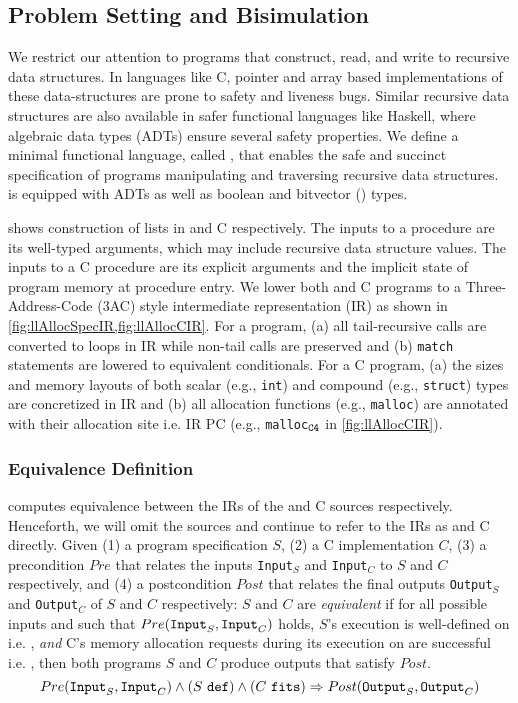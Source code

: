 \subsection{Problem Setting and Bisimulation}
\label{sec:syn-setting-bisimulation}
We restrict our attention to programs that construct, read, and write
to recursive data structures. In languages like C, pointer and array based
implementations of these data-structures are prone to safety and liveness bugs.
Similar recursive data structures are also available in safer functional languages like Haskell,
where algebraic data types (ADTs) \cite{hope} ensure several safety properties.
We define a minimal functional language, called \SpecL{}, that enables the safe
and succinct specification of programs manipulating and traversing recursive data structures.
\SpecL{} is equipped with ADTs as well as boolean and bitvector () types.



 shows construction of lists in \SpecL{} and C respectively.
The inputs to a \SpecL{} procedure are its well-typed arguments, which may include recursive data structure
values. The inputs to a C procedure are its explicit arguments and the implicit state of program memory
at procedure entry. We lower both \SpecL{} and C programs to a
Three-Address-Code (3AC) style intermediate representation (IR)
as shown in \cref{fig:llAllocSpecIR,fig:llAllocCIR}. For a \SpecL{} program,
(a) all tail-recursive calls are converted to loops in IR while non-tail calls are preserved and
(b) {\tt match} statements are lowered to equivalent \sumDtor{} conditionals.
For a C program, (a) the sizes and memory layouts of both scalar (e.g., {\tt int})
and compound (e.g., {\tt struct}) types are concretized in IR and
(b) all allocation functions (e.g., {\tt malloc}) are annotated with their
allocation site i.e. IR PC (e.g., {\tt malloc$_{\tt C4}$} in \cref{fig:llAllocCIR}).

\subsubsection{Equivalence Definition}
\label{sec:syn-equivalence}
\toolName{} computes equivalence between the IRs of the \SpecL{} and C sources respectively.
Henceforth, we will omit the sources and continue to refer to the IRs as \SpecL{} and C directly.
Given (1) a \SpecL{} program specification $S$, (2) a C implementation $C$,
(3) a precondition $Pre$ that relates the inputs {\tt Input}$_S$ and {\tt Input}$_C$ to $S$ and $C$
respectively, and (4) a postcondition $Post$ that relates the final outputs {\tt Output}$_S$
and {\tt Output}$_C$ of $S$ and $C$ respectively:
$S$ and $C$ are {\em equivalent} if for all possible inputs  and  such that
$Pre({\tt Input}_{S},{\tt Input}_{C})$ holds,
$S$'s execution is well-defined on  i.e. \sdef{}, {\em and} C's
memory allocation requests during its execution on  are successful i.e. \cfits{},
then both programs $S$ and $C$ produce outputs
that satisfy $Post$.
$$
Pre({\tt Input}_{S},{\tt Input}_{C}) \land {(S\ {\tt def})}{} \land {(C\ {\tt fits})}{} \Rightarrow Post({\tt Output}_{S},{\tt Output}_{C})
$$

